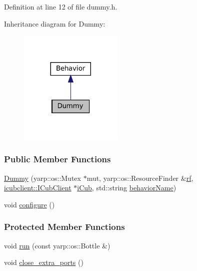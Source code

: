 Definition at line 12 of file dummy.\+h.



Inheritance diagram for Dummy\+:
\nopagebreak
\begin{figure}[H]
\begin{center}
\leavevmode
\includegraphics[width=140pt]{classDummy__inherit__graph}
\end{center}
\end{figure}
\subsubsection*{Public Member Functions}
\begin{DoxyCompactItemize}
\item 
\hyperlink{group__behaviorManager_ab859dd9c4a1d1ca5a3e452bd277b9ee3}{Dummy} (yarp\+::os\+::\+Mutex $\ast$mut, yarp\+::os\+::\+Resource\+Finder \&\hyperlink{group__behaviorManager_a789254580a094846e91a9892fa2bc4cd}{rf}, \hyperlink{group__icubclient__clients_classicubclient_1_1ICubClient}{icubclient\+::\+I\+Cub\+Client} $\ast$\hyperlink{group__behaviorManager_a5ab3f49bb3a40d79fe2b4aeb76e12196}{i\+Cub}, std\+::string \hyperlink{group__behaviorManager_aad9d5bf2f1f1e9c6902a4f40b03c4e67}{behavior\+Name})
\item 
void \hyperlink{group__behaviorManager_a493f3a2d8faa22b3175946e13b8dfe88}{configure} ()
\end{DoxyCompactItemize}
\subsubsection*{Protected Member Functions}
\begin{DoxyCompactItemize}
\item 
void \hyperlink{group__behaviorManager_a49b398f1050441b1a2f63da63420a6f1}{run} (const yarp\+::os\+::\+Bottle \&)
\item 
void \hyperlink{group__behaviorManager_aebfb66e2a5a0088968bf792f3adb1942}{close\+\_\+extra\+\_\+ports} ()
\end{DoxyCompactItemize}
